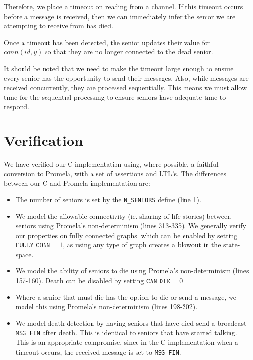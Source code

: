 \documentclass[12pt,a4paper]{scrartcl}
\begin{document}
Therefore, we place a timeout on reading from a channel.
If this timeout occurs before a message is received, then we can immediately infer the senior we are attempting to receive from has died.

Once a timeout has been detected, the senior updates their value for $conn(id,y)$ so that they are no longer connected to the dead senior.

It should be noted that we need to make the timeout large enough to ensure every senior has the opportunity to send their messages.
Also, while messages are received concurrently, they are processed sequentially.
This means we must allow time for the sequential processing to ensure seniors have adequate time to respond.

\section{Verification}
\label{sec:verification}
We have verified our C implementation using, where possible, a faithful conversion to Promela, with a set of assertions and LTL's.
The differences between our C and Promela implementation are:
\begin{itemize}
    \item The number of seniors is set by the \texttt{N\_SENIORS} define (line 1).
    \item We model the allowable connectivity (ie. sharing of life stories) between seniors using Promela's non-determinism (lines 313-335).
          We generally verify our properties on fully connected graphs, which can be enabled by setting $\texttt{FULLY\_CONN} = 1$,
            as using any type of graph creates a blowout in the state-space.
    \item We model the ability of seniors to die using Promela's non-determinism (lines 157-160).
          Death can be disabled by setting $\texttt{CAN\_DIE} = 0$
    \item Where a senior that must die has the option to die or send a message, we model this using Promela's non-determinism (lines 198-202).
    \item We model death detection by having seniors that have died send a broadcast \texttt{MSG\_FIN} after death.
          This is identical to seniors that have started talking.
          This is an appropriate compromise, since in the C implementation when a timeout occurs, the received message is set to \texttt{MSG\_FIN}.
\end{itemize}
\end{document}
